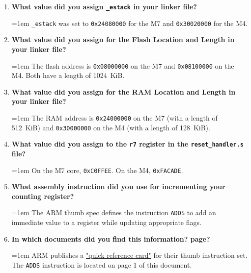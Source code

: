 \documentclass[letterpaper]{article}
\newenvironment{answer}
  {\par\smallskip\begingroup\leftskip=1em\noindent\ignorespaces}
  {\par\endgroup}
\begin{document}
\begin{enumerate}
    \item \textbf{What value did you assign \texttt{\_estack} in your linker file?}
    
\begin{answer}
    \texttt{\_estack} was set to \texttt{0x24080000} for the M7 and \texttt{0x30020000} for the M4.
\end{answer}
    
    \item \textbf{What value did you assign for the Flash Location and Length in your linker file?}
            
\begin{answer}
    The flash address is \texttt{0x08000000} on the M7 and \texttt{0x08100000} on the M4. Both have a length of 1024~KiB.
\end{answer}
    
    \item \textbf{What value did you assign for the RAM Location and Length in your linker file?}
        
\begin{answer}
    The RAM address is \texttt{0x24000000} on the M7 (with a length of 512~KiB) and \texttt{0x30000000} on the M4 (with a length of 128~KiB).
\end{answer}
    
    \item \textbf{What value did you assign to the \texttt{r7} register in the \texttt{reset\_handler.s} file?}
        
\begin{answer}
    On the M7 core, \texttt{0xC0FFEE}. On the M4, \texttt{0xFACADE}.
\end{answer}
    
    \item \textbf{What assembly instruction did you use for incrementing your counting register?}
    
\begin{answer}
    The ARM thumb spec defines the instruction \texttt{ADDS} to add an immediate value to a register while updating appropriate flags.
\end{answer}
    
    \item \textbf{In which documents did you find this information? page?}
        
\begin{answer}
    ARM publishes a \href{https://support.arm.com/documentation/qrc0006/e/}{"quick reference card"} for their thumb instruction set. The \texttt{ADDS} instruction is located on page 1 of this document.
\end{answer}
    

\end{enumerate}
\end{document}

